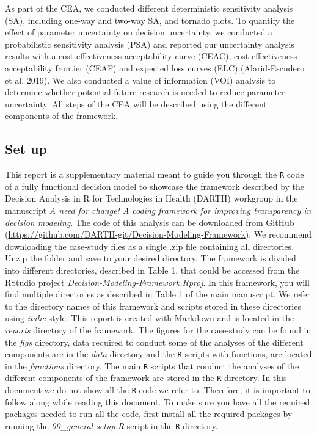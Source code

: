 \documentclass[]{article}
\begin{document}
As part of the CEA, we conducted different deterministic sensitivity
analysis (SA), including one-way and two-way SA, and tornado plots. To
quantify the effect of parameter uncertainty on decision uncertainty, we
conducted a probabilistic sensitivity analysis (PSA) and reported our
uncertainty analysis results with a cost-effectiveness acceptability
curve (CEAC), cost-effectiveness acceptability frontier (CEAF) and
expected loss curves (ELC) (Alarid-Escudero et al. 2019). We also
conducted a value of information (VOI) analysis to determine whether
potential future research is needed to reduce parameter uncertainty. All
steps of the CEA will be described using the different components of the
framework.

\subsection{Set up}\label{set-up}

This report is a supplementary material meant to guide you through the
\texttt{R} code of a fully functional decision model to showcase the
framework described by the Decision Analysis in R for Technologies in
Health (DARTH) workgroup in the manuscript \emph{A need for change! A
coding framework for improving transparency in decision modeling}. The
code of this analysis can be downloaded from GitHub
(\url{https://github.com/DARTH-git/Decision-Modeling-Framework}). We
recommend downloading the case-study files as a single .zip file
containing all directories. Unzip the folder and save to your desired
directory. The framework is divided into different directories,
described in Table 1, that could be accessed from the RStudio project
\emph{Decision-Modeling-Framework.Rproj}. In this framework, you will
find multiple directories as described in Table 1 of the main
manuscript. We refer to the directory names of this framework and
scripts stored in these directories using \emph{italic} style. This
report is created with Markdown and is located in the \emph{reports}
directory of the framework. The figures for the case-study can be found
in the \emph{figs} directory, data required to conduct some of the
analyses of the different components are in the \emph{data} directory
and the \texttt{R} scripts with functions, are located in the
\emph{functions} directory. The main \texttt{R} scripts that conduct the
analyses of the different components of the framework are stored in the
\texttt{R} directory. In this document we do not show all the \texttt{R}
code we refer to. Therefore, it is important to follow along while
reading this document. To make sure you have all the required packages
needed to run all the code, first install all the required packages by
running the \emph{00\_general-setup.R} script in the \texttt{R}
directory.
\end{document}
